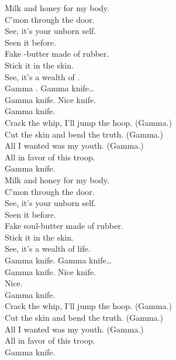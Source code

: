 


Milk and honey for my body. \\
C'mon through the door. \\
See, it's your unborn self. \\
Seen it before. \\

Fake -butter made of rubber. \\
Stick it in the skin. \\
See, it's a wealth of . \\

Gamma . Gamma knife… \\

Gamma knife. Nice knife. \\
Gamma knife. \\

Crack the whip, I'll jump the hoop. (Gamma.) \\
Cut the skin and bend the truth. (Gamma.) \\
All I wanted was my youth. (Gamma.) \\
All in favor of this troop. \\
Gamma knife. \\

Milk and honey for my body. \\
C'mon through the door. \\
See, it's your unborn self. \\

Seen it before. \\
Fake soul-butter made of rubber. \\
Stick it in the skin. \\
See, it's a wealth of life. \\

Gamma knife. Gamma knife… \\

Gamma knife. Nice knife. \\
Nice. \\
Gamma knife. \\

Crack the whip, I'll jump the hoop. (Gamma.) \\
Cut the skin and bend the truth. (Gamma.) \\
All I wanted was my youth. (Gamma.) \\
All in favor of this troop. \\
Gamma knife. \\


